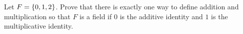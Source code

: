 \begin{problem}
  Let $F = \left\{0, 1, 2\right\}$.
  Prove that there is exactly one way to define
  addition and multiplication so that $F$ is a field
  if $0$ is the additive identity and $1$ is the multiplicative identity.
\end{problem}

\begin{answer}

\end{answer}
